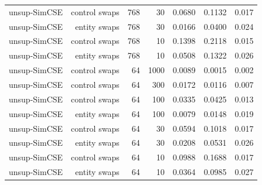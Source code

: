 \begin{table}[t]
\begin{tabular}{lrrrrrr}
unsup-SimCSE & control swaps & 768 & 30 & 0.0680 & 0.1132 & 0.017 \\
unsup-SimCSE & entity swaps & 768 & 30 & 0.0166 & 0.0400 & 0.024 \\
unsup-SimCSE & control swaps & 768 & 10 & 0.1398 & 0.2118 & 0.015 \\
unsup-SimCSE & entity swaps & 768 & 10 & 0.0508 & 0.1322 & 0.026 \\
unsup-SimCSE & control swaps & 64 & 1000 & 0.0089 & 0.0015 & 0.002 \\
unsup-SimCSE & control swaps & 64 & 300 & 0.0172 & 0.0116 & 0.007 \\
unsup-SimCSE & control swaps & 64 & 100 & 0.0335 & 0.0425 & 0.013 \\
unsup-SimCSE & entity swaps & 64 & 100 & 0.0079 & 0.0148 & 0.019 \\
unsup-SimCSE & control swaps & 64 & 30 & 0.0594 & 0.1018 & 0.017 \\
unsup-SimCSE & entity swaps & 64 & 30 & 0.0208 & 0.0531 & 0.026 \\
unsup-SimCSE & control swaps & 64 & 10 & 0.0988 & 0.1688 & 0.017 \\
unsup-SimCSE & entity swaps & 64 & 10 & 0.0364 & 0.0985 & 0.027 \\
\bottomrule
\end{tabular}
\end{table}
